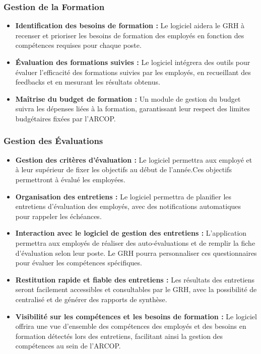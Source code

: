 \subsubsection{Gestion de la Formation}
\begin{itemize}
    \item \textbf{Identification des besoins de formation :} Le logiciel aidera le GRH à recenser et prioriser les besoins de formation des employés en fonction des compétences requises pour chaque poste.
    
    \item \textbf{Évaluation des formations suivies :} Le logiciel intégrera des outils pour évaluer l'efficacité des formations suivies par les employés, en recueillant des feedbacks et en mesurant les résultats obtenus.
    
    \item \textbf{Maîtrise du budget de formation :} Un module de gestion du budget suivra les dépenses liées à la formation, garantissant leur respect des limites budgétaires fixées par l'ARCOP.
\end{itemize}

\subsubsection{Gestion des Évaluations}
\begin{itemize}
    \item \textbf{Gestion des critères d'évaluation :} Le logiciel permettra aux employé et à leur supérieur de fixer les objectifs au début de l'année.Ces objectifs permettront à évalué les employées.
    \item \textbf{Organisation des entretiens :} Le logiciel permettra de planifier les entretiens d'évaluation des employés, avec des notifications automatiques pour rappeler les échéances.
    
    \item \textbf{Interaction avec le logiciel de gestion des entretiens :} L'application permettra aux employés de réaliser des auto-évaluations et de remplir la fiche d'évaluation selon leur poste. Le GRH pourra personnaliser ces questionnaires pour évaluer les compétences spécifiques.
    
    \item \textbf{Restitution rapide et fiable des entretiens :} Les résultats des entretiens seront facilement accessibles et consultables par le GRH, avec la possibilité de centralisé et de générer des rapports de synthèse.
    
    \item \textbf{Visibilité sur les compétences et les besoins de formation :} Le logiciel offrira une vue d'ensemble des compétences des employés et des besoins en formation détectés lors des entretiens, facilitant ainsi la gestion des compétences au sein de l'ARCOP.
\end{itemize}

